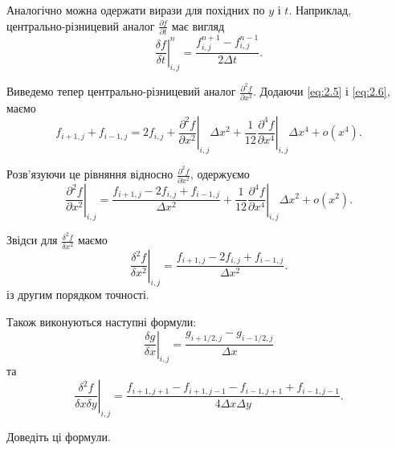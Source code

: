 \begin{remark}
    Аналогічно можна одержати вирази для похідних по $y$ і $t$. Наприклад, центрально-різницевий аналог $\frac{\partial f}{\partial t}$ має вигляд
    \begin{equation}
        \label{eq:2.9}
        \left. \frac{\delta f}{\delta t} \right|_{i, j}^n = \frac{f_{i, j}^{n + 1} - f_{i, j}^{n - 1}}{2 \Delta t}.
    \end{equation}
\end{remark}

Виведемо тепер центрально-різницевий аналог $\frac{\partial^2 f}{\partial x^2}$. Додаючи \eqref{eq:2.5} і \eqref{eq:2.6}, маємо
\begin{equation}
    \label{eq:2.10}
    f_{i + 1, j} + f_{i - 1, j} = 2 f_{i, j} + \left. \frac{\partial^2 f}{\partial x^2} \right|_{i, j} \Delta x^2 + \frac{1}{12} \left. \frac{\partial^4 f}{\partial x^4} \right|_{i, j} \Delta x^4 + o(x^4).
\end{equation}

Розв'язуючи це рівняння відносно $\frac{\partial^2 f}{\partial x^2}$, одержуємо
\begin{equation}
    \label{eq:2.11}
    \left. \frac{\partial^2 f}{\partial x^2} \right|_{i, j} = \frac{f_{i + 1, j} - 2 f_{i, j} + f_{i - 1, j}}{\Delta x^2} + \frac{1}{12} \left. \frac{\partial^4 f}{\partial x^4} \right|_{i, j} \Delta x^2 + o(x^2).
\end{equation}

\begin{th_formula}
    Звідси для $\frac{\delta^2 f}{\delta x^2}$ маємо
    \begin{equation}
        \label{eq:2.12}
        \left. \frac{\delta^2 f}{\delta x^2} \right|_{i, j} = \frac{f_{i + 1, j} - 2 f_{i, j} + f_{i - 1, j}}{\Delta x^2}.
    \end{equation}
    із другим порядком точності.
\end{th_formula}

Також виконуються наступні формули:
\begin{equation}
    \label{eq:2.13}
    \left. \frac{\delta g}{\delta x} \right|_{i, j} = \frac{g_{i + 1/2, j} - g_{i - 1/2, j}}{\Delta x}
\end{equation}
та
\begin{equation}
    \label{eq:2.14}
    \left. \frac{\delta^2 f}{\delta x \delta y} \right|_{i, j} = \frac{f_{i + 1, j + 1} - f_{i + 1, j - 1} - f_{i - 1, j + 1} + f_{i - 1, j - 1}}{4 \Delta x \Delta y}.
\end{equation}
\begin{exercise}
    Доведіть ці формули.
\end{exercise}

